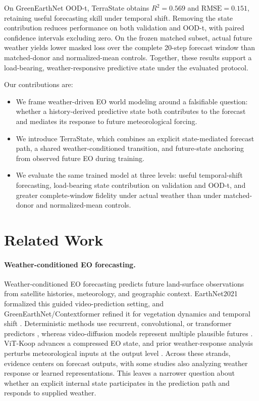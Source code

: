 \documentclass[letterpaper]{article} %
\begin{document}
On GreenEarthNet OOD-t, TerraState obtains \(R^2=0.569\) and
\(\mathrm{RMSE}=0.151\), retaining useful forecasting skill under temporal
shift. Removing the state contribution reduces performance on both validation
and OOD-t, with paired confidence intervals excluding zero. On the frozen
matched subset, actual future weather yields lower masked loss over the
complete 20-step forecast window than matched-donor and normalized-mean
controls. Together, these results support a load-bearing, weather-responsive
predictive state under the evaluated protocol.

Our contributions are:
\begin{itemize}
    \item We frame weather-driven EO world modeling around a falsifiable
    question: whether a history-derived predictive state both contributes to
    the forecast and mediates its response to future meteorological forcing.
    \item We introduce TerraState, which combines an explicit state-mediated
    forecast path, a shared weather-conditioned transition, and future-state
    anchoring from observed future EO during training.
    \item We evaluate the same trained model at three levels: useful
    temporal-shift forecasting, load-bearing state contribution on validation
    and OOD-t, and greater complete-window fidelity under actual weather than
    under matched-donor and normalized-mean controls.
\end{itemize}

\section{Related Work}

\paragraph{Weather-conditioned EO forecasting.}
Weather-conditioned EO forecasting predicts future land-surface observations
from satellite histories, meteorology, and geographic context. EarthNet2021
formalized this guided video-prediction setting, and GreenEarthNet/Contextformer
refined it for vegetation dynamics and temporal shift
\cite{requenamesa2021earthnet,benson2024multimodal}. Deterministic methods use
recurrent, convolutional, or transformer predictors
\cite{shi2015convlstm,wang2017predrnn,gao2022simvp,gao2022earthformer}, whereas
video-diffusion models represent multiple plausible futures
\cite{voleti2022mcvd,zhao2024vegediff}. ViT-Koop advances a compressed EO state,
and prior weather-response analysis perturbs meteorological inputs at the output
level \cite{shinohara2025vitkoop,diaconu2022weather}. Across these strands,
evidence centers on forecast outputs, with some studies also analyzing weather
response or learned representations. This leaves a narrower question about
whether an explicit internal state participates in the prediction path and
responds to supplied weather.
\end{document}
